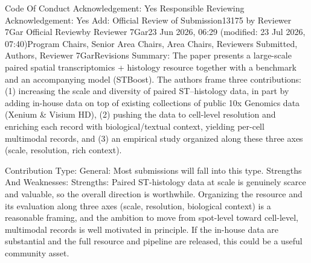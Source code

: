 Code Of Conduct Acknowledgement: Yes
Responsible Reviewing Acknowledgement: Yes
Add:
Official Review of Submission13175 by Reviewer 7Gar
Official Reviewby Reviewer 7Gar23 Jun 2026, 06:29 (modified: 23 Jul 2026, 07:40)Program Chairs, Senior Area Chairs, Area Chairs, Reviewers Submitted, Authors, Reviewer 7GarRevisions
Summary:
The paper presents a large-scale paired spatial transcriptomics + histology resource together with a benchmark and an accompanying model (STBoost). The authors frame three contributions: (1) increasing the scale and diversity of paired ST–histology data, in part by adding in-house data on top of existing collections of public 10x Genomics data (Xenium & Visium HD), (2) pushing the data to cell-level resolution and enriching each record with biological/textual context, yielding per-cell multimodal records, and (3) an empirical study organized along these three axes (scale, resolution, rich context).

Contribution Type: General: Most submissions will fall into this type.
Strengths And Weaknesses:
Strengths: Paired ST-histology data at scale is genuinely scarce and valuable, so the overall direction is worthwhile. Organizing the resource and its evaluation along three axes (scale, resolution, biological context) is a reasonable framing, and the ambition to move from spot-level toward cell-level, multimodal records is well motivated in principle. If the in-house data are substantial and the full resource and pipeline are released, this could be a useful community asset.

